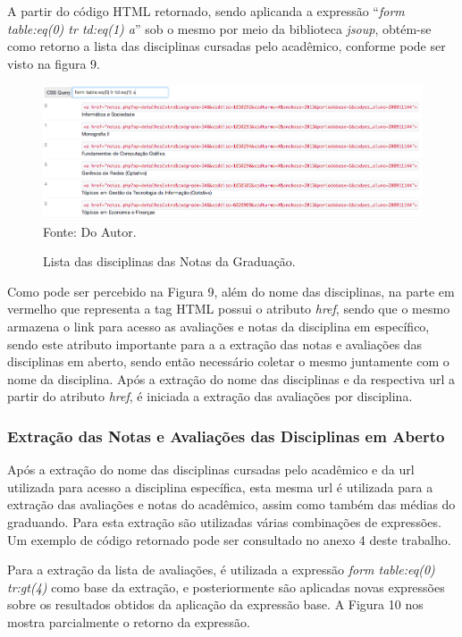 A partir do código HTML retornado, sendo aplicanda a expressão ``\emph{form table:eq(0) tr td:eq(1) a}'' sob o mesmo por meio da biblioteca \emph{jsoup}, obtém-se como retorno a lista das disciplinas cursadas pelo acadêmico, conforme pode ser visto na figura 9.

\begin{figure}[!htb]
     \centering
     \caption[Extração de Informações - Lista das disciplinas Notas da Graduação]{Lista das disciplinas das Notas da Graduação.}
     \includegraphics[scale=0.45]{imagens/listadisciplinasnotasgraduacao.png}
     \\  Fonte: Do Autor.
\end{figure}

Como pode ser percebido na Figura 9, além do nome das disciplinas, na parte em vermelho que representa a tag HTML possui o atributo \emph{href}, sendo que o mesmo armazena o link para acesso as avaliações e notas da disciplina em específico, sendo este atributo importante para a a extração das notas e avaliações das disciplinas em aberto, sendo então necessário coletar o mesmo juntamente com o nome da disciplina. Após a extração do nome das disciplinas e da respectiva url a partir do atributo \emph{href}, é iniciada a extração das avaliações por disciplina.

\subsubsection{Extração das Notas e Avaliações das Disciplinas em Aberto}
Após a extração do nome das disciplinas cursadas pelo acadêmico e da url utilizada para acesso a disciplina específica, esta mesma url é utilizada para a extração das avaliações e notas do acadêmico, assim como também das médias do graduando. Para esta extração são utilizadas várias combinações de expressões. Um exemplo de código retornado pode ser consultado no anexo 4 deste trabalho.

Para a extração da lista de avaliações, é utilizada a expressão \emph{form table:eq(0) tr:gt(4)} como base da extração, e posteriormente são aplicadas novas expressões sobre os resultados obtidos da aplicação da expressão base. A Figura 10 nos mostra parcialmente o retorno da expressão.

